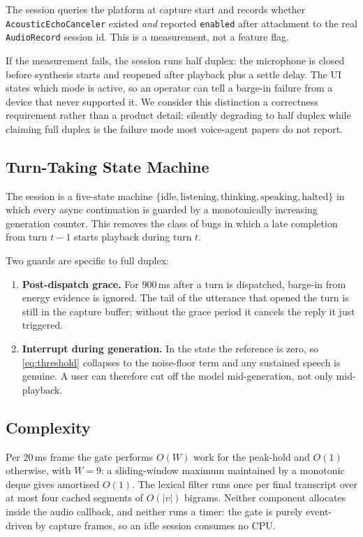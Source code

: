 The session queries the platform at capture start and records whether
\texttt{AcousticEchoCanceler} existed \emph{and} reported \texttt{enabled}
after attachment to the real \texttt{AudioRecord} session id. This is a
measurement, not a feature flag.

If the measurement fails, the session runs half duplex: the microphone is
closed before synthesis starts and reopened after playback plus a settle delay.
The UI states which mode is active, so an operator can tell a barge-in failure
from a device that never supported it. We consider this distinction a
correctness requirement rather than a product detail: silently degrading to
half duplex while claiming full duplex is the failure mode most voice-agent
papers do not report.

\subsection{Turn-Taking State Machine}

The session is a five-state machine
$\{\text{idle}, \text{listening}, \text{thinking}, \text{speaking},
\text{halted}\}$ in which every async continuation is guarded by a monotonically
increasing generation counter. This removes the class of bugs in which a late
completion from turn $t-1$ starts playback during turn $t$.

Two guards are specific to full duplex:

\begin{enumerate}
  \item \textbf{Post-dispatch grace.} For $900$\,ms after a turn is dispatched,
        barge-in from energy evidence is ignored. The tail of the utterance
        that opened the turn is still in the capture buffer; without the grace
        period it cancels the reply it just triggered.
  \item \textbf{Interrupt during generation.} In the  state the
        reference is zero, so \eqref{eq:threshold} collapses to the noise-floor
        term and any sustained speech is genuine. A user can therefore cut off
        the model mid-generation, not only mid-playback.
\end{enumerate}

\subsection{Complexity}

Per 20\,ms frame the gate performs $O(W)$ work for the peak-hold and $O(1)$
otherwise, with $W=9$: a sliding-window maximum maintained by a monotonic deque
gives amortised $O(1)$. The lexical filter runs once per final transcript over
at most four cached segments of $O(|v|)$ bigrams. Neither component allocates
inside the audio callback, and neither runs a timer: the gate is purely
event-driven by capture frames, so an idle session consumes no CPU.

